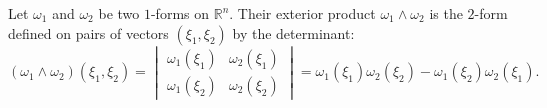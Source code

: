 Let $\omega_1$ and $\omega_2$ be two $1$-forms on $\mathbb{R}^n$. Their exterior product $\omega_1 \wedge \omega_2$ is the $2$-form defined on pairs of vectors $(\xi_1, \xi_2)$ by the determinant:
$$(\omega_1 \wedge \omega_2)(\xi_1, \xi_2) = \begin{vmatrix} \omega_1(\xi_1) & \omega_2(\xi_1) \\ \omega_1(\xi_2) & \omega_2(\xi_2) \end{vmatrix} = \omega_1(\xi_1)\omega_2(\xi_2) - \omega_1(\xi_2)\omega_2(\xi_1).$$
